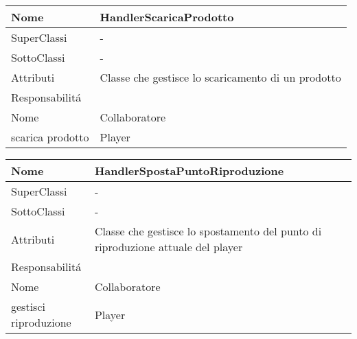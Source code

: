 \begin{center}
    \begin{tabular}{ |p{3cm}|p{3cm}|p{3cm}|p{3cm}| }
        \hline
        Nome & \multicolumn{3}{|p{9cm}|}{HandlerScaricaProdotto} \\\hline
        SuperClassi & \multicolumn{3}{|p{9cm}|}{-} \\\hline
        SottoClassi & \multicolumn{3}{|p{9cm}|}{-} \\\hline
        Attributi & \multicolumn{3}{|p{9cm}|}{Classe che gestisce lo scaricamento di un prodotto} \\\hline
        \multicolumn{4}{|p{12cm}|}{Responsabilit\'a} \\\hline
        \multicolumn{2}{|p{6cm}|}{Nome} & \multicolumn{2}{|p{6cm}|}{Collaboratore} \\\hline
        \multicolumn{2}{|p{6cm}|}{scarica prodotto} & \multicolumn{2}{|p{6cm}|}{Player} \\\hline
    \end{tabular}
\end{center}

\begin{center}
    \begin{tabular}{ |p{3cm}|p{3cm}|p{3cm}|p{3cm}| }
        \hline
        Nome & \multicolumn{3}{|p{9cm}|}{HandlerSpostaPuntoRiproduzione} \\\hline
        SuperClassi & \multicolumn{3}{|p{9cm}|}{-} \\\hline
        SottoClassi & \multicolumn{3}{|p{9cm}|}{-} \\\hline
        Attributi & \multicolumn{3}{|p{9cm}|}{Classe che gestisce lo spostamento del punto di riproduzione attuale del player} \\\hline
        \multicolumn{4}{|p{12cm}|}{Responsabilit\'a} \\\hline
        \multicolumn{2}{|p{6cm}|}{Nome} & \multicolumn{2}{|p{6cm}|}{Collaboratore} \\\hline
        \multicolumn{2}{|p{6cm}|}{gestisci riproduzione} & \multicolumn{2}{|p{6cm}|}{Player} \\\hline
    \end{tabular}
\end{center}

